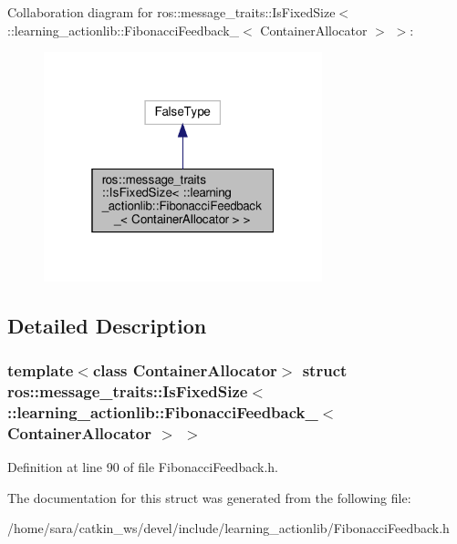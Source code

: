 Collaboration diagram for ros\+:\+:message\+\_\+traits\+:\+:Is\+Fixed\+Size$<$ \+:\+:learning\+\_\+actionlib\+:\+:Fibonacci\+Feedback\+\_\+$<$ Container\+Allocator $>$ $>$\+:
\nopagebreak
\begin{figure}[H]
\begin{center}
\leavevmode
\includegraphics[width=229pt]{structros_1_1message__traits_1_1IsFixedSize_3_01_1_1learning__actionlib_1_1FibonacciFeedback___3377051c84704d8b16dd20e20032b4d78}
\end{center}
\end{figure}


\subsection{Detailed Description}
\subsubsection*{template$<$class Container\+Allocator$>$\newline
struct ros\+::message\+\_\+traits\+::\+Is\+Fixed\+Size$<$ \+::learning\+\_\+actionlib\+::\+Fibonacci\+Feedback\+\_\+$<$ Container\+Allocator $>$ $>$}



Definition at line 90 of file Fibonacci\+Feedback.\+h.



The documentation for this struct was generated from the following file\+:\begin{DoxyCompactItemize}
\item 
/home/sara/catkin\+\_\+ws/devel/include/learning\+\_\+actionlib/Fibonacci\+Feedback.\+h\end{DoxyCompactItemize}
